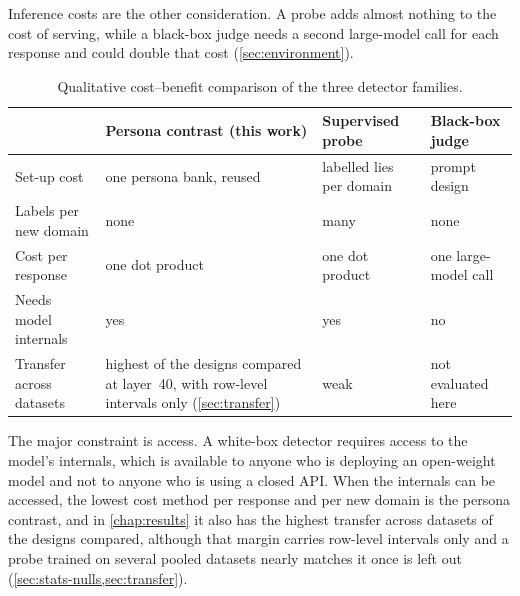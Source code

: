 Inference costs are the other consideration. A probe adds almost nothing to the cost of serving,
while a black-box judge needs a second large-model call for each response and could double that cost
(\cref{sec:environment}).

\begin{table}[t]
\centering
\small
\caption{Qualitative cost--benefit comparison of the three detector families.}
\label{tab:costbenefit}
\begin{tabularx}{\linewidth}{@{}>{\raggedright\arraybackslash}p{3.3cm} >{\raggedright\arraybackslash}X >{\raggedright\arraybackslash}X >{\raggedright\arraybackslash}X@{}}
\toprule
 & Persona contrast (this work) & Supervised probe & Black-box judge \\
\midrule
Set-up cost & one persona bank, reused & labelled lies per domain & prompt design \\
Labels per new domain & none & many & none \\
Cost per response & one dot product & one dot product & one large-model call \\
Needs model internals & yes & yes & no \\
Transfer across datasets & highest of the designs compared at layer~40, with row-level intervals
only (\cref{sec:transfer}) & weak & not evaluated here \\
\bottomrule
\end{tabularx}
\end{table}

The major constraint is access. A white-box detector requires access to the model's internals,
which is available to anyone who is deploying an open-weight model and not to anyone who is
using a closed API. When the internals can be accessed, the lowest cost method per response
and per new domain is the persona contrast, and in \cref{chap:results} it also has the highest transfer across datasets
of the designs compared, although that margin carries row-level intervals only and a probe trained
on several pooled datasets nearly matches it once \hpkr{} is left out
(\cref{sec:stats-nulls,sec:transfer}).
